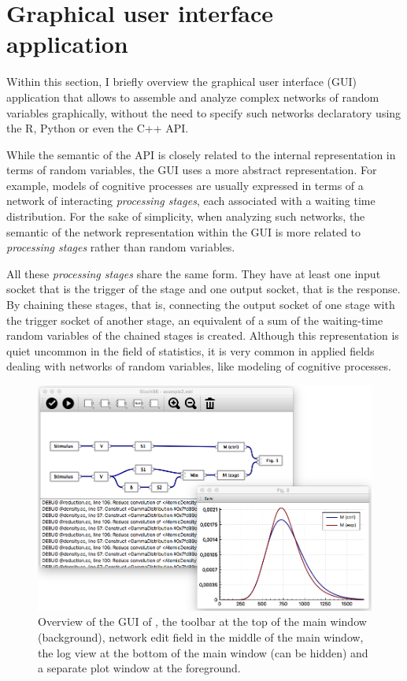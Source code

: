 \section{Graphical user interface application} \label{sec:gui}
Within this section, I briefly overview the graphical user interface (GUI) application that allows to assemble and analyze complex networks of random variables graphically, without the need to specify such networks declaratory using the R, Python or even the C++ API. 

While the semantic of the  API is closely related to the internal representation in terms of random variables, the GUI uses a more abstract representation. For example, models of cognitive processes are usually expressed in terms of a network of interacting \emph{processing stages}, each associated with a waiting time distribution. For the sake of simplicity, when analyzing such networks, the semantic of the network representation within the GUI is more related to \emph{processing stages} rather than random variables. 

All these \emph{processing stages} share the same form. They have at least one input socket that is the trigger of the stage and one output socket, that is the response. By chaining these stages, that is, connecting the output socket of one stage with the trigger socket of another stage, an equivalent of a sum of the waiting-time random variables of the chained stages is created. Although this representation is quiet uncommon in the field of statistics, it is very common in applied fields dealing with networks of random variables, like modeling of cognitive processes.

\begin{figure}[!ht]
 \centering
 \includegraphics[width=.75\textwidth]{fig/GUI2.png}
 \caption{Overview of the GUI of , the toolbar at the top of the main window (background), network edit field in the middle of the main window, the log view at the bottom of the main window (can be hidden) and a separate plot window at the foreground.} \label{fig:gui}
\end{figure}

